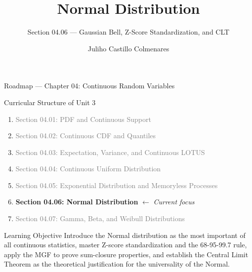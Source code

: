 \documentclass[aspectratio=169,xcolor={dvipsnames,table}]{beamer}
\title{Normal Distribution}
\subtitle{Section 04.06 --- Gaussian Bell, Z-Score Standardization, and CLT}
\author[J. Castillo Colmenares]{Juliho Castillo Colmenares}
\institute[Tec de Monterrey]{Tecnologico de Monterrey}
\date{\vspace{-1.5cm}}
\begin{document}
\begin{frame}[plain]
	\titlepage
\end{frame}

\begin{frame}{Roadmap --- Chapter 04: Continuous Random Variables}
	\vspace{-0.15cm}
	\begin{block}{Curricular Structure of Unit 3}
		\footnotesize
		\begin{enumerate}\itemsep=0.03cm
			\item \textcolor{gray}{Section 04.01: PDF and Continuous Support}
			\item \textcolor{gray}{Section 04.02: Continuous CDF and Quantiles}
			\item \textcolor{gray}{Section 04.03: Expectation, Variance, and Continuous LOTUS}
			\item \textcolor{gray}{Section 04.04: Continuous Uniform Distribution}
			\item \textcolor{gray}{Section 04.05: Exponential Distribution and Memoryless Processes}
			\item \textbf{\textcolor{TecRojo}{Section 04.06: Normal Distribution}} $\leftarrow$ \emph{Current focus}
			\item \textcolor{gray}{Section 04.07: Gamma, Beta, and Weibull Distributions}
		\end{enumerate}
	\end{block}
	\vspace{-0.2cm}
	\begin{alertblock}{Learning Objective}
		\scriptsize
		Introduce the Normal distribution as the most important of all continuous statistics, master Z-score standardization and the 68-95-99.7 rule, apply the MGF to prove sum-closure properties, and establish the Central Limit Theorem as the theoretical justification for the universality of the Normal.
	\end{alertblock}
\end{frame}
\end{document}
